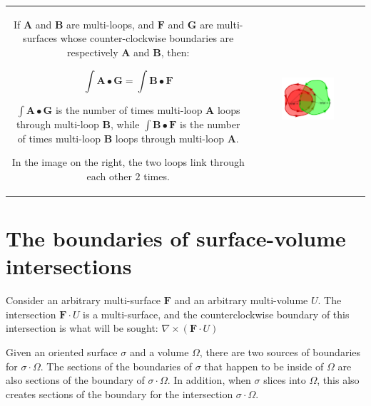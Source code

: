 \begin{tabular}{cc}
\parbox{0.5\textwidth}{
If \(\mathbf{A}\) and \(\mathbf{B}\) are multi-loops, and \(\mathbf{F}\) and \(\mathbf{G}\) are multi-surfaces whose counter-clockwise boundaries are respectively \(\mathbf{A}\) and \(\mathbf{B}\), then:

\[\int \mathbf{A} \bullet \mathbf{G} = \int \mathbf{B} \bullet \mathbf{F}\]

\(\int \mathbf{A} \bullet \mathbf{G}\) is the number of times multi-loop \(\mathbf{A}\) loops through multi-loop \(\mathbf{B}\), while \(\int \mathbf{B} \bullet \mathbf{F}\) is the number of times multi-loop \(\mathbf{B}\) loops through multi-loop \(\mathbf{A}\).

In the image on the right, the two loops link through each other \(2\) times. 
} & \parbox{0.5\textwidth}{
\includegraphics[width = 0.5\textwidth]{Boundaries/Path_endpoints/Stokes_theorem}
}
\end{tabular}




\section{The boundaries of surface-volume intersections}

Consider an arbitrary multi-surface \(\mathbf{F}\) and an arbitrary multi-volume \(U\). The intersection \(\mathbf{F} \cdot U\) is a multi-surface, and the counterclockwise boundary of this intersection is what will be sought: \(\nabla \times (\mathbf{F} \cdot U)\) 

Given an oriented surface \(\sigma\) and a volume \(\Omega\), there are two sources of boundaries for \(\sigma \cdot \Omega\). The sections of the boundaries of \(\sigma\) that happen to be inside of \(\Omega\) are also sections of the boundary of \(\sigma \cdot \Omega\). In addition, when \(\sigma\) slices into \(\Omega\), this also creates sections of the boundary for the intersection \(\sigma \cdot \Omega\).   

